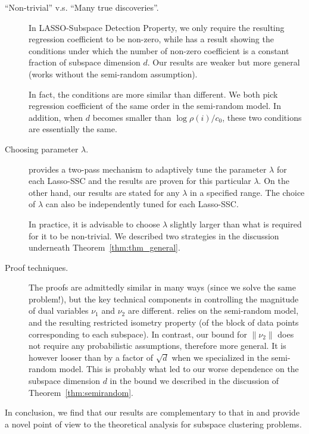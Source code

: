 \documentclass[twoside,11pt]{article}
\numberwithin{equation}{section}
\begin{document}
\begin{description}
  \item[``Non-trivial'' v.s. ``Many true discoveries''.] In LASSO-Subspace Detection Property, we only require the resulting regression coefficient to be non-zero, while \citet[Theorem~3.2]{soltanolkotabi2013robust} has a result showing the conditions under which the number of non-zero coefficient is a constant fraction of subspace dimension $d$. Our results are weaker but more general (works without the semi-random assumption).

      In fact, the conditions are more similar than different. We both pick regression coefficient of the same order in the semi-random model. In addition, when $d$ becomes smaller than $\log \rho(i)/c_0$,   these two conditions are essentially the same.

  \item[Choosing parameter $\lambda$.]
        \citet{soltanolkotabi2013robust} provides a two-pass mechanism to adaptively tune the parameter $\lambda$ for each Lasso-SSC and the results are proven for this particular $\lambda$.
        On the other hand, our results are stated for any $\lambda$ in a specified range. The choice of $\lambda$ can also be independently tuned for each Lasso-SSC.

      In practice, it is advisable to choose $\lambda$ slightly larger than what is required for it to be non-trivial. We described two strategies in the discussion underneath Theorem~\ref{thm:thm_general}.

  \item[Proof techniques.] The proofs are admittedly similar in many ways (since we solve the same problem!), but the key technical components in controlling the magnitude of dual variables $\nu_1$ and $\nu_2$ are different. \citet[Lemma~8.5]{soltanolkotabi2013robust} relies on the semi-random model, and the resulting restricted isometry property (of the block of data points corresponding to each subspace). In contrast, our bound for $\|\nu_2\|$ does not require any probabilistic assumptions, therefore more general. %
  It is however looser than \citet[Lemma~8.5]{soltanolkotabi2013robust} by a factor of $\sqrt{d}$ when we specialized in the semi-random model.
  This is probably what led to our worse dependence on the subspace dimension $d$ in the bound we described in the discussion of Theorem~\ref{thm:semirandom}.
\end{description}
In conclusion, we find that our results are complementary to that in \citet{soltanolkotabi2013robust} and provide a novel point of view to the theoretical analysis for subspace clustering problems.
\end{document}
